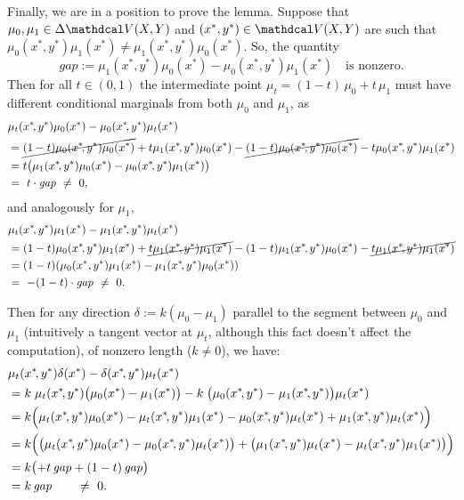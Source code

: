 \begin{subappendices}
\begin{lproof}
    Finally, we are in a position to prove the lemma.
    Suppose that $\mu_0,\mu_1 \in \Delta\V(X,Y)$ and $(x^*,y^*) \in \V(X,Y)$
    are such that $\mu_0(x^*,y^*) \mu_1(x^*)  \ne \mu_1(x^*,y^*) \mu_0(x^*)$.
    So, the quantity
    \[
        \mathit{gap} := \mu_1(x^*,y^*) \mu_0(x^*) - \mu_0(x^*,y^*) \mu_1(x^*)
        \quad\text{is nonzero}.
    \]
    Then for all $t \in (0,1)$ the intermediate point $\mu_t = (1-t)\, \mu_0 + t\, \mu_1$ must have different conditional marginals from both $\mu_0$ and $\mu_1$, as
    \begin{align*}
        &\mu_t(x^*\!,y^*)\mu_0(x^*) - \mu_0(x^*\!,y^*) \mu_t(x^*) \\
            &= \Cancel{(1-t)\mu_0(x^*\!,y^*)\mu_0(x^*)} + t \mu_1(x^*\!,y^*)\mu_0(x^*)
                -  \Cancel{(1-t)\mu_0(x^*\!,y^*) \mu_0(x^*)} - t\mu_0(x^*\!,y^*) \mu_1(x^*) \\
            &= t \pqty[\big] { \mu_1(x^*\!,y^*)\mu_0(x^*) -\mu_0(x^*\!,y^*) \mu_1(x^*)}
            \\
            &=~ t \cdot \mathit{gap}
            ~\ne~ 0,
    \end{align*}
    and analogously for $\mu_1$,
    \begin{align*}
        &\mu_t(x^*\!,y^*)\mu_1(x^*) - \mu_1(x^*\!,y^*) \mu_t(x^*) \\
            &= (1-t)\mu_0(x^*\!,y^*)\mu_1(x^*) + {\color{black}\cancel{\color{black} t \mu_1(x^*\!,y^*)\mu_1(x^*) }}
                -  (1-t)\mu_1(x^*\!,y^*) \mu_0(x^*) - {\color{black}\cancel{\color{black} t\mu_1(x^*\!,y^*) \mu_1(x^*) }} \\
            &= (1-t) (\mu_0(x^*,y^*)\mu_1(x^*) -\mu_1(x^*\!,y^*) \mu_0(x^*))
            \\
            &=~ -(1-t) \cdot \mathit{gap}
            ~\ne~ 0.
    \end{align*}

    Then for any direction $\delta := k(\mu_0 - \mu_1)$ parallel to the segment between $\mu_0$ and $\mu_1$ (intuitively a tangent vector at $\mu_t$, although this fact doesn't affect the computation), of nonzero length ($k\ne 0$), we have:
    \begin{align*}
        &
        \mu_t(x^*\!,y^*) \delta(x^*)  - \delta(x^*\!,y^*) \mu_t(x^*)
        \\
        &= k\; \mu_t(x^*\!,y^*) \pqty[\big]{\mu_0(x^*) - \mu_1(x^*)}  - k\; \pqty[\big]{\mu_0(x^*\!,y^*)-\mu_1(x^*\!,y^*)} \mu_t(x^*) \\
        &= k \pqty[\Big]{\mu_t(x^*\!,y^*)\mu_0(x^*) - \mu_t(x^*\!,y^*)\mu_1(x^*)
            -\mu_0(x^*\!,y^*)\mu_t(x^*) + \mu_1(x^*\!,y^*)\mu_t(x^*)} \\
        &= k \pqty[\Big]{ \pqty[\big]{ \mu_t(x^*\!,y^*)\mu_0(x^*) -\mu_0(x^*\!,y^*)\mu_t(x^*)} + \pqty[\big]{\mu_1(x^*\!,y^*)\mu_t(x^*) - \mu_t(x^*\!,y^*)\mu_1(x^*)}} \\
        &= k \pqty[\big]{ + t \,\mathit{gap} + (1-t) \,\mathit{gap}} \\
        &= k \,\mathit{gap} \qquad \ne~ 0.
    \end{align*}


\end{lproof}
\end{subappendices}
